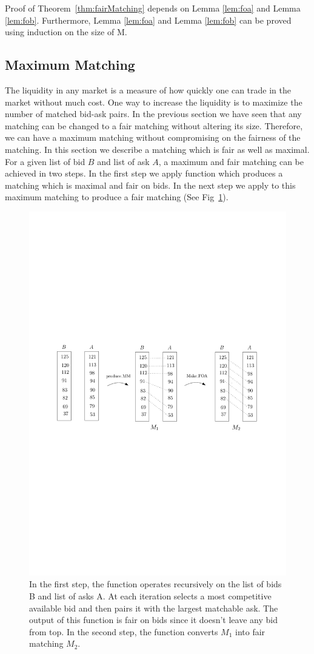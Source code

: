 \documentclass[a4paper,UKenglish,cleveref, autoref]{lipics-v2019}
\begin{document}
Proof of Theorem~\ref{thm:fairMatching} depends on Lemma \ref{lem:foa} and Lemma \ref{lem:fob}. Furthermore, Lemma \ref{lem:foa} and Lemma \ref{lem:fob} can be proved using induction on the size of M. 

\subsection{Maximum Matching}

The liquidity in any market is a measure of how quickly one can trade in the market without much cost. One way to increase the liquidity is to maximize the number of matched bid-ask pairs. In the previous section we have seen that any matching can be changed to a fair matching without altering its size. Therefore, we can have a maximum matching without compromising on the fairness of the matching. In this section we describe a matching which is fair as well as maximal. For a given list of bid $B$ and list of ask $A$, a maximum and fair matching can be achieved in two steps. In the first step we apply function  which produces a matching which is maximal and fair on bids. In the next step we apply  to this maximum matching to produce a fair matching (See Fig~\ref{fig:mm}).

\begin{figure}[h!]
\centering
\includegraphics[width=.6\textwidth]{MM.pdf}
\caption{In the first step, the function  operates recursively on the list of bids B and list of asks A. At each iteration  selects a most competitive available bid and then pairs it with the largest matchable ask. The output of this function is fair on bids since it doesn't leave any bid from top. In the second step, the function  converts  $M_1$ into fair matching $M_2$. }
\label{fig:mm}
\end{figure}
\end{document}
